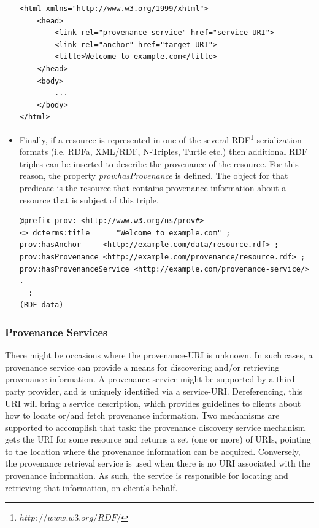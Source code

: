 \begin{itemize}
\begin{verbatim}
<html xmlns="http://www.w3.org/1999/xhtml">
    <head>
        <link rel="provenance-service" href="service-URI">
        <link rel="anchor" href="target-URI">
        <title>Welcome to example.com</title>
    </head>
    <body>
        ...
    </body>
</html>
\end{verbatim}
  \item
        Finally, if a resource is represented in one of the several RDF\footnote{$http://www.w3.org/RDF/$} serialization formats (i.e. RDFa, XML/RDF, N-Triples, Turtle etc.) then additional RDF triples can be inserted to describe the provenance of the resource. For this reason, the property \emph{prov:hasProvenance} is defined. The object for that predicate is the resource that contains provenance information about a resource that is subject of this triple.

\begin{verbatim}
@prefix prov: <http://www.w3.org/ns/prov#>
<> dcterms:title      "Welcome to example.com" ;
prov:hasAnchor     <http://example.com/data/resource.rdf> ;
prov:hasProvenance <http://example.com/provenance/resource.rdf> ;
prov:hasProvenanceService <http://example.com/provenance-service/> .
  :
(RDF data)
\end{verbatim}

\end{itemize}

\subsubsection{Provenance Services}

There might be occasions where the provenance-URI is unknown. In such cases, a provenance service can provide a means for discovering and/or retrieving provenance information. A provenance service might be supported by a third-party provider, and is uniquely identified via a service-URI. Dereferencing, this URI will bring a service description, which provides guidelines to clients about how to locate or/and fetch provenance information. Two mechanisms are supported to accomplish that task: the provenance discovery service mechanism gets the URI for some resource and returns a set (one or more) of URIs, pointing to the location where the provenance information can be acquired. Conversely, the provenance retrieval service is used when there is no URI associated with the provenance information. As such, the service is responsible for locating and retrieving that information, on client's behalf.

